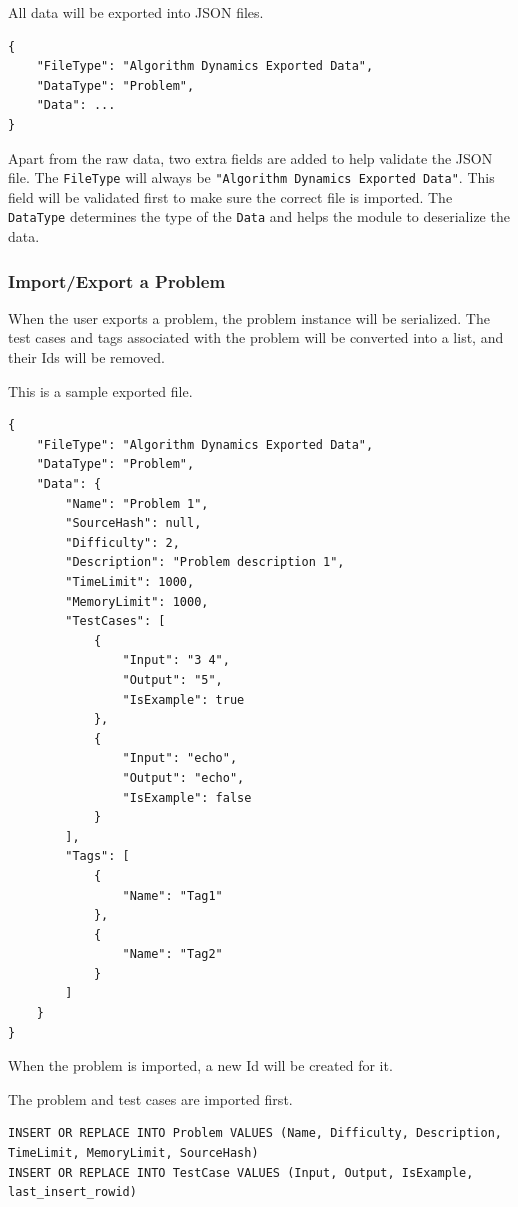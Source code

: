 \documentclass[a4paper]{report}
\begin{document}
All data will be exported into JSON files.

\begin{verbatim}
{
    "FileType": "Algorithm Dynamics Exported Data",
    "DataType": "Problem",
    "Data": ...
}
\end{verbatim}

Apart from the raw data, two extra fields are added to help validate the JSON file. The \texttt{FileType} will always be \texttt{"Algorithm Dynamics Exported Data"}. This field will be validated first to make sure the correct file is imported. The \texttt{DataType} determines the type of the \texttt{Data} and helps the module to deserialize the data.

\subsubsection{Import/Export a Problem}

When the user exports a problem, the problem instance will be serialized. The test cases and tags associated with the problem will be converted into a list, and their Ids will be removed.

This is a sample exported file.

\begin{verbatim}
{
    "FileType": "Algorithm Dynamics Exported Data",
    "DataType": "Problem",
    "Data": {
        "Name": "Problem 1",
        "SourceHash": null,
        "Difficulty": 2,
        "Description": "Problem description 1",
        "TimeLimit": 1000,
        "MemoryLimit": 1000,
        "TestCases": [
            {
                "Input": "3 4",
                "Output": "5",
                "IsExample": true
            },
            {
                "Input": "echo",
                "Output": "echo",
                "IsExample": false
            }
        ],
        "Tags": [
            {
                "Name": "Tag1"
            },
            {
                "Name": "Tag2"
            }
        ]
    }
}
\end{verbatim}

When the problem is imported, a new Id will be created for it.

The problem and test cases are imported first.

\begin{verbatim}
INSERT OR REPLACE INTO Problem VALUES (Name, Difficulty, Description, TimeLimit, MemoryLimit, SourceHash)
INSERT OR REPLACE INTO TestCase VALUES (Input, Output, IsExample, last_insert_rowid)
\end{verbatim}
\end{document}

